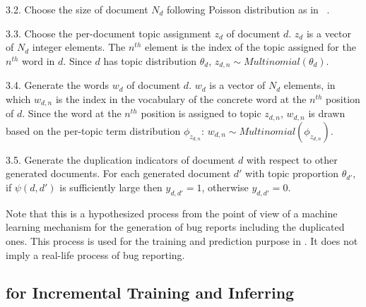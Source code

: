 3.2. Choose the size of document $N_d$ following Poisson
     distribution as in ~\cite{RTM}.

3.3. Choose the per-document topic assignment $z_d$ of document
     $d$. $z_d$ is a vector of $N_d$ integer elements. The $n^{th}$
     element is the index of the topic assigned for the $n^{th}$ word
     in $d$. Since $d$ has topic distribution $\theta_d$,
     $z_{d,n} \sim Multinomial(\theta_d)$.

3.4. Generate the words $w_d$ of document $d$. $w_d$ is a vector of $N_d$
     elements, in which $w_{d,n}$ is the index in the vocabulary of
     the concrete word at the $n^{th}$ position of $d$. Since the
     word at the $n^{th}$ position is assigned to topic $z_{d,n}$,
     $w_{d,n}$ is drawn based on the per-topic term distribution
     $\phi_{z_{d,n}}$: $w_{d,n} \sim Multinomial(\phi_{z_{d,n}})$.

3.5. Generate the duplication indicators of document $d$ with respect
     to other generated documents. For each generated document $d'$
     with topic proportion $\theta_{d'}$, if $\psi(d, d')$ is sufficiently large
     then $y_{d,d'} = 1$, otherwise $y_{d,d'} = 0$.



Note that this is a hypothesized process from the point of view of a
machine learning mechanism for the generation of bug reports including
the duplicated ones. This process is used for the training and
prediction purpose in {\model}. It does not imply a real-life process
of bug reporting.


\subsection{{\model} for Incremental Training and Inferring}

